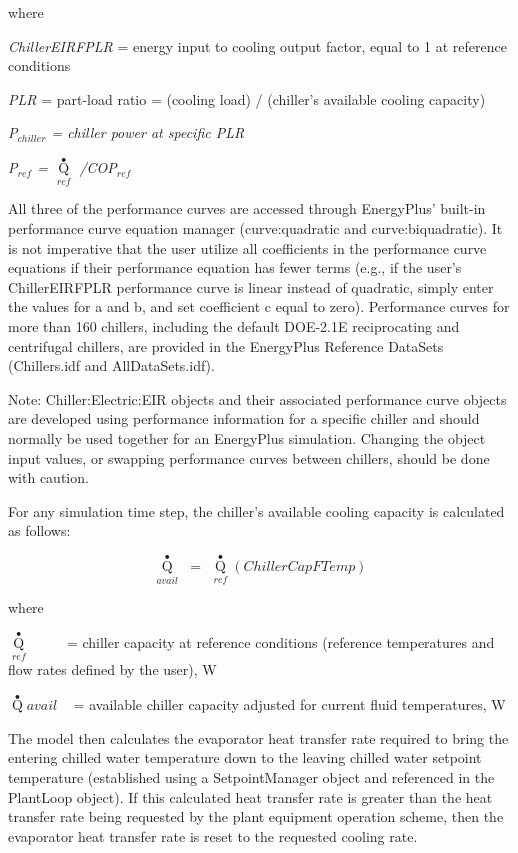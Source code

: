 where

\emph{ChillerEIRFPLR} = energy input to cooling output factor, equal to 1 at reference conditions

\emph{PLR} = part-load ratio = (cooling load) / (chiller's available cooling capacity)

\emph{P\(_{chiller}\) = chiller power at specific PLR}

\emph{P\(_{ref}\) = \({\mathop Q\limits^ \bullet_{ref}}\) /COP\(_{ref}\)}

All three of the performance curves are accessed through EnergyPlus' built-in performance curve equation manager (curve:quadratic and curve:biquadratic). It is not imperative that the user utilize all coefficients in the performance curve equations if their performance equation has fewer terms (e.g., if the user's ChillerEIRFPLR performance curve is linear instead of quadratic, simply enter the values for a and b, and set coefficient c equal to zero). Performance curves for more than 160 chillers, including the default DOE-2.1E reciprocating and centrifugal chillers, are provided in the EnergyPlus Reference DataSets (Chillers.idf and AllDataSets.idf).

Note: Chiller:Electric:EIR objects and their associated performance curve objects are developed using performance information for a specific chiller and should normally be used together for an EnergyPlus simulation. Changing the object input values, or swapping performance curves between chillers, should be done with caution.

For any simulation time step, the chiller's available cooling capacity is calculated as follows:

\begin{equation}
{\mathop Q\limits^ \bullet_{avail}}\,\, = \,\,{\mathop Q\limits^ \bullet_{ref}}\left( {ChillerCapFTemp} \right)
\end{equation}

where

\({\mathop Q\limits^ \bullet_{ref}}\) ~~~~ = chiller capacity at reference conditions (reference temperatures and flow rates defined by the user), W

\(\mathop Q\limits^ \bullet avail\) ~ = available chiller capacity adjusted for current fluid temperatures, W

The model then calculates the evaporator heat transfer rate required to bring the entering chilled water temperature down to the leaving chilled water setpoint temperature (established using a SetpointManager object and referenced in the PlantLoop object). If this calculated heat transfer rate is greater than the heat transfer rate being requested by the plant equipment operation scheme, then the evaporator heat transfer rate is reset to the requested cooling rate.

